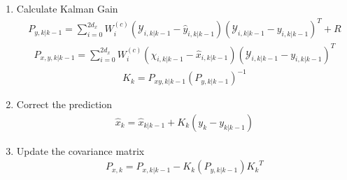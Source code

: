 \begin{enumerate}
       \item Calculate Kalman Gain
        \begin{align*}
       P_{y, k | k-1} = \sum^{2d_x}_{i = 0} W_i^{(c)} (\mathcal{Y}_{i, k | k - 1} -  \hat y_{i, k | k - 1} )(\mathcal{Y}_{i, k | k - 1} -  y_{i, k | k - 1} )^T + R
       \end{align*}
        \begin{align*}
       P_{x,y, k | k-1} = \sum^{2d_x}_{i = 0} W_i^{(c)} (\chi_{i, k | k - 1} -  \hat x_{i, k | k - 1} )(\mathcal{Y}_{i, k | k - 1} -  y_{i, k | k - 1} )^T 
       \end{align*}
       \begin{align*}
       K_k = P_{xy, k | k-1} (P_{y, k | k-1}) ^{-1}
       \end{align*}
        
      \item Correct the prediction      
      \begin{align*}
       \hat x_{k} = \hat x_{k|k-1} + K_k(y_k -y_{k|k-1})
        \end{align*}
      
      
      \item Update the covariance matrix 
       \begin{align*}
       P_{x, k} = P_{x, k|k-1} -K_k (P_{y, k | k-1} ) {K_k}^T     
       \end{align*}     
            
            
            
            
            
            
            
            
            
            
            
            
            
            
            
            
            
            
    
    
        
\end{enumerate}